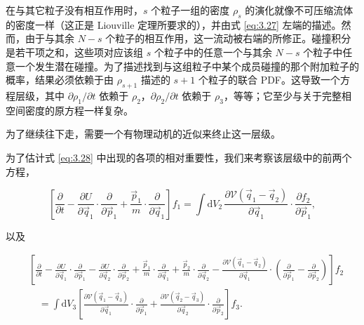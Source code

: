 在与其它粒子没有相互作用时，$s$ 个粒子一组的密度 $\rho_s$ 的演化就像不可压缩流体的密度一样（这正是 Liouville 定理所要求的），并由式 \eqref{eq:3.27} 左端的描述。然而，由于与其余 $N-s$ 个粒子的相互作用，这一流动被右端的所修正。碰撞积分是若干项之和，这些项对应该组 $s$ 个粒子中的任意一个与其余 $N-s$ 个粒子中任意一个发生潜在碰撞。为了描述找到与这组粒子中某个成员碰撞的那个附加粒子的概率，结果必须依赖于由 $\rho_{s+1}$ 描述的 $s+1$ 个粒子的联合 PDF。这导致一个方程层级，其中 $\partial\rho_1/\partial t$ 依赖于 $\rho_2$，$\partial\rho_2/\partial t$ 依赖于 $\rho_3$，等等；它至少与关于完整相空间密度的原方程一样复杂。

为了继续往下走，需要一个有物理动机的近似来终止这一层级。


为了估计式 \eqref{eq:3.28} 中出现的各项的相对重要性，我们来考察该层级中的前两个方程，

\begin{equation}\label{eq:3.29}
  \left[\frac{\partial}{\partial t}-\frac{\partial U}{\partial\vec q_1}\cdot\frac{\partial}{\partial\vec p_1}+\frac{\vec p_1}{m}\cdot\frac{\partial}{\partial\vec q_1}\right]f_1=\int \mathrm{d}V_2\,\frac{\partial\mathscr V(\vec q_1-\vec q_2)}{\partial\vec q_1}\cdot\frac{\partial f_2}{\partial\vec p_1},
\end{equation}

以及

\begin{equation}\label{eq:3.30}
  \begin{aligned}
    &\left[\frac{\partial}{\partial t}-\frac{\partial U}{\partial\vec q_1}\cdot\frac{\partial}{\partial\vec p_1}-\frac{\partial U}{\partial\vec q_2}\cdot\frac{\partial}{\partial\vec p_2}+\frac{\vec p_1}{m}\cdot\frac{\partial}{\partial\vec q_1}+\frac{\vec p_2}{m}\cdot\frac{\partial}{\partial\vec q_2}-\frac{\partial\mathscr V(\vec q_1-\vec q_2)}{\partial\vec q_1}\cdot\left(\frac{\partial}{\partial\vec p_1}-\frac{\partial}{\partial\vec p_2}\right)\right]f_2\\
    &\quad=\int \mathrm{d}V_3\left[\frac{\partial\mathscr V(\vec q_1-\vec q_3)}{\partial\vec q_1}\cdot\frac{\partial}{\partial\vec p_1}+\frac{\partial\mathscr V(\vec q_2-\vec q_3)}{\partial\vec q_2}\cdot\frac{\partial}{\partial\vec p_2}\right]f_3.
  \end{aligned}
\end{equation}

